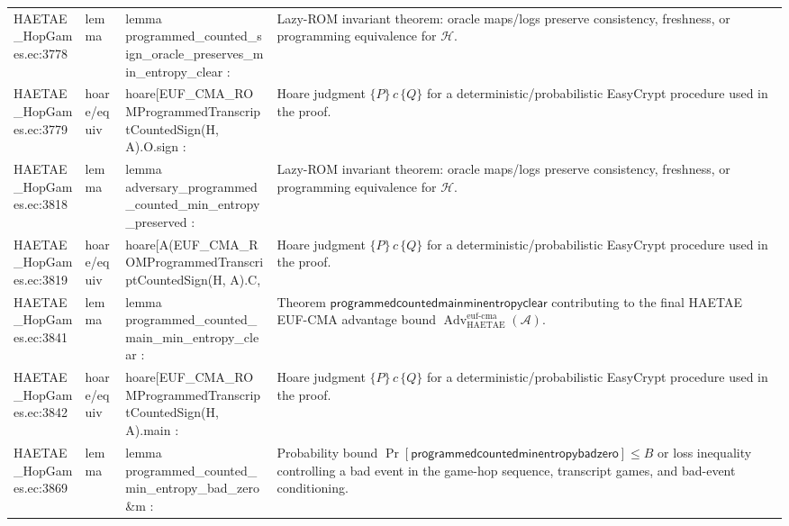 \documentclass[10pt]{article}
\newcommand{\Adv}{\operatorname{Adv}}
\begin{document}
\begin{longtable}{L{0.11\textwidth}L{0.055\textwidth}L{0.385\textwidth}L{0.41\textwidth}}
HAETAE\_\allowbreak{}HopGames.\allowbreak{}ec:\allowbreak{}3778 & lemma & {\ttfamily\scriptsize lemma programmed\_\allowbreak{}counted\_\allowbreak{}sign\_\allowbreak{}oracle\_\allowbreak{}preserves\_\allowbreak{}min\_\allowbreak{}entropy\_\allowbreak{}clear :} & Lazy-ROM invariant theorem: oracle maps/logs preserve consistency, freshness, or programming equivalence for $\mathcal H$. \\
HAETAE\_\allowbreak{}HopGames.\allowbreak{}ec:\allowbreak{}3779 & hoare/equiv & {\ttfamily\scriptsize hoare[EUF\_\allowbreak{}CMA\_\allowbreak{}ROMProgrammedTranscriptCountedSign(H, A).O.sign :} & Hoare judgment $\{P\}\,c\,\{Q\}$ for a deterministic/probabilistic EasyCrypt procedure used in the proof. \\
HAETAE\_\allowbreak{}HopGames.\allowbreak{}ec:\allowbreak{}3818 & lemma & {\ttfamily\scriptsize lemma adversary\_\allowbreak{}programmed\_\allowbreak{}counted\_\allowbreak{}min\_\allowbreak{}entropy\_\allowbreak{}preserved :} & Lazy-ROM invariant theorem: oracle maps/logs preserve consistency, freshness, or programming equivalence for $\mathcal H$. \\
HAETAE\_\allowbreak{}HopGames.\allowbreak{}ec:\allowbreak{}3819 & hoare/equiv & {\ttfamily\scriptsize hoare[A(EUF\_\allowbreak{}CMA\_\allowbreak{}ROMProgrammedTranscriptCountedSign(H, A).C,} & Hoare judgment $\{P\}\,c\,\{Q\}$ for a deterministic/probabilistic EasyCrypt procedure used in the proof. \\
HAETAE\_\allowbreak{}HopGames.\allowbreak{}ec:\allowbreak{}3841 & lemma & {\ttfamily\scriptsize lemma programmed\_\allowbreak{}counted\_\allowbreak{}main\_\allowbreak{}min\_\allowbreak{}entropy\_\allowbreak{}clear :} & Theorem $\mathsf{programmedcountedmainminentropyclear}$ contributing to the final HAETAE EUF-CMA advantage bound $\Adv_{\mathrm{HAETAE}}^{\mathrm{euf\mbox{-}cma}}(\mathcal A)$. \\
HAETAE\_\allowbreak{}HopGames.\allowbreak{}ec:\allowbreak{}3842 & hoare/equiv & {\ttfamily\scriptsize hoare[EUF\_\allowbreak{}CMA\_\allowbreak{}ROMProgrammedTranscriptCountedSign(H, A).main :} & Hoare judgment $\{P\}\,c\,\{Q\}$ for a deterministic/probabilistic EasyCrypt procedure used in the proof. \\
HAETAE\_\allowbreak{}HopGames.\allowbreak{}ec:\allowbreak{}3869 & lemma & {\ttfamily\scriptsize lemma programmed\_\allowbreak{}counted\_\allowbreak{}min\_\allowbreak{}entropy\_\allowbreak{}bad\_\allowbreak{}zero \&m :} & Probability bound $\Pr[\mathsf{programmedcountedminentropybadzero}]\le B$ or loss inequality controlling a bad event in the game-hop sequence, transcript games, and bad-event conditioning. \\

\end{longtable}
\end{document}
